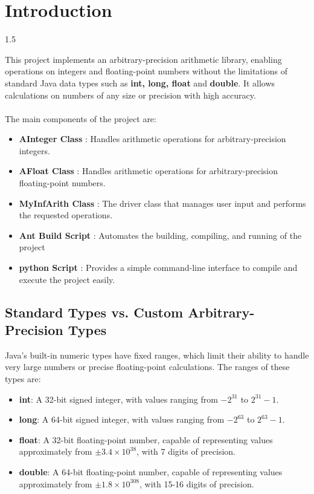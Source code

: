 \documentclass{article}
\begin{document}
\section{\fontsize{16pt}{30pt}Introduction}

\begin{spacing}{1.5}{\large This project implements an arbitrary-precision arithmetic library, enabling operations on integers and floating-point numbers without the limitations of standard Java data types such as \textbf{int, long, float} and \textbf{double}. It allows calculations on numbers of any size or precision with high accuracy.\\
\\
The main components of the project are:
\begin{itemize}
    \item\textbf{AInteger Class}   : Handles arithmetic operations for arbitrary-precision integers.
    
    \item\textbf{AFloat Class}     : Handles arithmetic operations for arbitrary-precision floating-point numbers.
   
    \item\textbf{MyInfArith Class} : The driver class that manages user input and performs the requested operations.
   
    \item\textbf{Ant Build Script} : Automates the building, compiling, and running of the project
   
    \item\textbf{python Script}    : Provides a simple command-line interface to compile and execute the project easily.
\end{itemize}

\subsection{Standard Types vs. Custom Arbitrary-Precision Types}

Java's built-in numeric types have fixed ranges, which limit their ability to handle very large numbers or precise floating-point calculations. The ranges of these types are:
\begin{itemize}
    \item\textbf{int}: A 32-bit signed integer, with values ranging from \(-2^{31}\) to \(2^{31} - 1\).
    \item\textbf{long}: A 64-bit signed integer, with values ranging from \(-2^{63}\) to \(2^{63} - 1\).
    \item\textbf{float}: A 32-bit floating-point number, capable of representing values approximately from \(\pm 3.4 \times 10^{38}\), with 7 digits of precision.
    \item\textbf{double}: A 64-bit floating-point number, capable of representing values approximately from \(\pm 1.8 \times 10^{308}\), with 15-16 digits of precision.
    

\end{itemize}}
\end{spacing}
\end{document}
